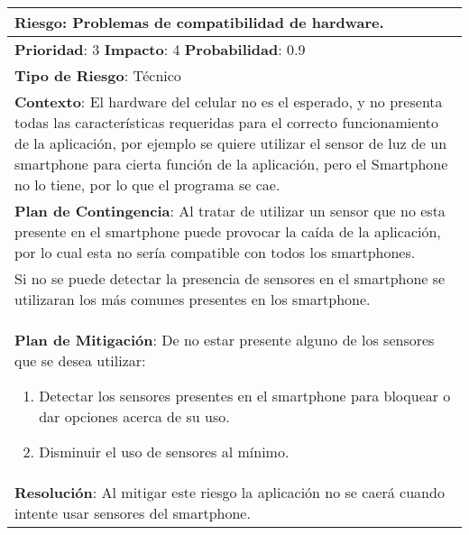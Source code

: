 \begin{table}[H]
  \centering
  \begin{tabular}{|p{15cm}|}\hline
    {\bf Riesgo}: Problemas de compatibilidad de hardware.\\\hline
    {\bf Prioridad}: 3  {\bf Impacto}: 4  {\bf Probabilidad}: 0.9\\\hline
    {\bf Tipo de Riesgo}: Técnico\\\hline
    {\bf Contexto}: El hardware del celular no es el esperado, y no presenta todas las características requeridas para el correcto funcionamiento de la aplicación, por ejemplo se quiere utilizar el sensor de luz de un smartphone para cierta función de la aplicación, pero el Smartphone no lo tiene, por lo que el programa se cae.\\\hline
    {\bf Plan de Contingencia}: Al tratar de utilizar un sensor que no esta presente en el smartphone puede provocar la caída de la aplicación, por lo cual esta no sería compatible con todos los smartphones.\\Si no se puede detectar la presencia de sensores en el smartphone se utilizaran los m\'as comunes presentes en los smartphone.\\\hline
    {\bf Plan de Mitigación}: De no estar presente alguno de los sensores que se desea utilizar:\begin{enumerate}\item Detectar los sensores presentes en el smartphone  para bloquear o dar opciones acerca de su uso.\item Disminuir el uso de sensores al mínimo.\end{enumerate}\\\hline
    {\bf Resolución}: Al mitigar este riesgo la aplicación no se caerá cuando intente usar sensores del smartphone.\\\hline
  \end{tabular}
  \label{table:R2}
\end{table}


